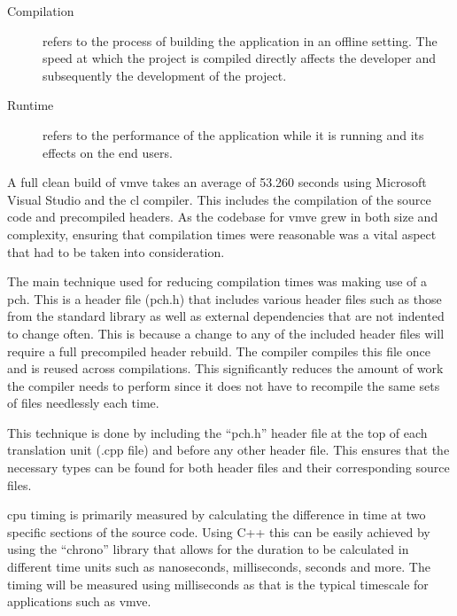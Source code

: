 \documentclass[11pt]{article}
\begin{document}
\begin{description}
  \item[Compilation] refers to the process of building the application in an offline
  setting. The speed at which the project is compiled directly affects the
  developer and subsequently the development of the project.
  \item[Runtime] refers to the performance of the application while it is running and
  its effects on the end users.
\end{description}

A full clean build of \gls*{vmve} takes an average of 53.260 seconds using
Microsoft Visual Studio and the \gls*{cl} compiler. This includes the compilation
of the source code and precompiled headers. As the codebase for \gls*{vmve} grew
in both size and complexity, ensuring that compilation times were reasonable was
a vital aspect that had to be taken into consideration.

The main technique used for reducing compilation times was making use of a
\gls*{pch}. This is a header file (pch.h) that includes various header files such
as those from the standard library as well as external dependencies that are not
indented to change often. This is because a change to any of the included header
files will require a full precompiled header rebuild. The compiler compiles this
file once and is reused across compilations. This significantly reduces the
amount of work the compiler needs to perform since it does not have to recompile
the same sets of files needlessly each time.

This technique is done by including the ``pch.h'' header file at the top of each
translation unit (.cpp file) and before any other header file. This ensures that
the necessary types can be found for both header files and their corresponding
source files.

\gls*{cpu} timing is primarily measured by calculating the difference in time at
two specific sections of the source code. Using C++ this can be easily achieved
by using the ``chrono'' library that allows for the duration to be calculated in
different time units such as nanoseconds, milliseconds, seconds and more. The
timing will be measured using milliseconds as that is the typical timescale for
applications such as \gls*{vmve}.
\end{document}
